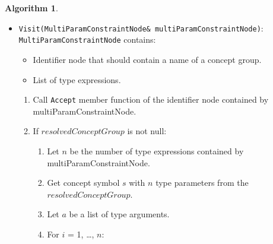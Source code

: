 \documentclass[a4paper,oneside,11pt]{book}
\theoremstyle{definition}
\newtheorem{algo}{Algorithm}[section]
\begin{document}
\begin{algo}
\begin{itemize}
\begin{enumerate}
\begin{enumerate}
\item
Add $leftType$ to $a$.
\item
Compute a 16-byte $conceptId$ using algorithm \ref{computeconceptid} for the concept symbol $s$ and list of type arguments $a$.
\item
Lookup $conceptId$ from the concept repository (section \ref{conceptrepository}).
\item
If found, push \textbf{true} to the constraint check stack,
and push a bound constraint cloned from the bound constraint contained by the instantiated concept to the stack of bound constraints.
and return.
\item
Otherwise, instantiate concept $s$ with type arguments $a$ using algorithm \ref{instantiateconcept}.
Let $c$ be the instantiated concept.
\item
If $c$ is not null, add $c$ to the concept repository with id $conceptId$, push \textbf{true} to the constraint check stack,
push a bound constraint corresponding to $c$ to the stack of bound constraints, and return.
\item
Otherwise, push \textbf{false} to the constraint check stack, push \verb|BoundAtomicConstraint| with value \textbf{false}
to the stack of bound constraints.
\end{enumerate}
\end{enumerate}
\item
\verb|Visit(MultiParamConstraintNode& multiParamConstraintNode)|:\\
\verb|MultiParamConstraintNode| contains:
\begin{itemize}
\item
Identifier node that should contain a name of a concept group.
\item
List of type expressions.
\end{itemize}
\begin{enumerate}
\item
Call \verb|Accept| member function of the identifier node contained by multiParamConstraintNode.
\item
If $resolvedConceptGroup$ is not null:
\begin{enumerate}
\item
Let $n$ be the number of type expressions contained by multiParamConstraintNode.
\item
Get concept symbol $s$ with $n$ type parameters from the $resolvedConceptGroup$.
\item
Let $a$ be a list of type arguments.
\item
For $i$ = 1, \ldots, $n$:

\end{enumerate}
\end{enumerate}
\end{itemize}
\end{algo}
\end{document}
